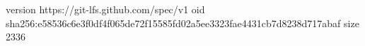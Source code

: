version https://git-lfs.github.com/spec/v1
oid sha256:e58536c6e3f0df4f065de72f15585fd02a5ee3323fae4431cb7d8238d717abaf
size 2336
